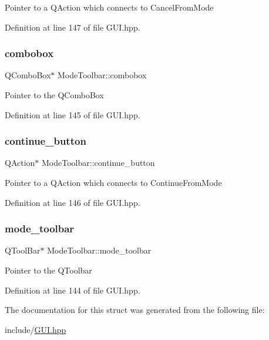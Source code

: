 Pointer to a Q\+Action which connects to Cancel\+From\+Mode 

Definition at line 147 of file G\+U\+I.\+hpp.

\mbox{\label{structModeToolbar_ad0ba4f03ef2a44e2543add404a50b4f1}} 
\subsubsection{\texorpdfstring{combobox}{combobox}}
{\footnotesize\ttfamily Q\+Combo\+Box$\ast$ Mode\+Toolbar\+::combobox}

Pointer to the Q\+Combo\+Box 

Definition at line 145 of file G\+U\+I.\+hpp.

\mbox{\label{structModeToolbar_af7d7766f5b1710abb382c42689e963ca}} 
\subsubsection{\texorpdfstring{continue\+\_\+button}{continue\_button}}
{\footnotesize\ttfamily Q\+Action$\ast$ Mode\+Toolbar\+::continue\+\_\+button}

Pointer to a Q\+Action which connects to Continue\+From\+Mode 

Definition at line 146 of file G\+U\+I.\+hpp.

\mbox{\label{structModeToolbar_acc6bcdd91825343f34ec38d312418234}} 
\subsubsection{\texorpdfstring{mode\+\_\+toolbar}{mode\_toolbar}}
{\footnotesize\ttfamily Q\+Tool\+Bar$\ast$ Mode\+Toolbar\+::mode\+\_\+toolbar}

Pointer to the Q\+Toolbar 

Definition at line 144 of file G\+U\+I.\+hpp.



The documentation for this struct was generated from the following file\+:\begin{DoxyCompactItemize}
\item 
include/\mbox{\hyperlink{GUI_8hpp}{G\+U\+I.\+hpp}}\end{DoxyCompactItemize}
